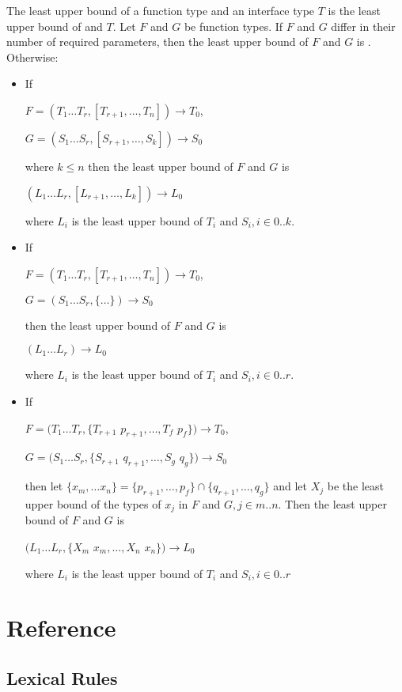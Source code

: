 \documentclass{article}
\begin{document}
\LMHash{}
The least upper bound of a function type and an interface type $T$ is the least upper bound of  and $T$.
Let $F$ and $G$ be function types. If $F$ and $G$ differ in their number of required parameters, then the least upper bound of $F$ and $G$ is .  Otherwise:
\begin{itemize}
\item If

$F= (T_1 \ldots T_r, [T_{r+1}, \ldots, T_n]) \longrightarrow T_0$,

$G= (S_1 \ldots S_r, [S_{r+1}, \ldots, S_k]) \longrightarrow S_0$

where $k \le n$ then the least upper bound of $F$ and $G$ is

$(L_1 \ldots L_r, [L_{r+1}, \ldots, L_k]) \longrightarrow L_0$

where $L_i$ is the least upper bound of $T_i$ and $S_i, i \in 0..k$.
\item If

$F= (T_1 \ldots T_r, [T_{r+1}, \ldots, T_n]) \longrightarrow T_0$,

$G= (S_1 \ldots S_r, \{ \ldots \}) \longrightarrow S_0$

then the least upper bound of $F$ and $G$ is

$(L_1 \ldots L_r) \longrightarrow L_0$

where $L_i$
is the least upper bound of $T_i$ and $S_i, i \in 0..r$.
\item If

$F= (T_1 \ldots T_r, \{T_{r+1}$  $p_{r+1}, \ldots, T_f$ $p_f\}) \longrightarrow T_0$,

$G= (S_1 \ldots S_r, \{ S_{r+1}$  $q_{r+1}, \ldots, S_g$ $q_g\}) \longrightarrow S_0$

then let $\{x_m, \ldots x_n\}  = \{p_{r+1}, \ldots, p_f\} \cap \{q_{r+1}, \ldots, q_g\}$ and let $X_j$ be the least upper bound of the types of $x_j$ in $F$ and $G, j \in m..n$. Then
the least upper bound of $F$ and $G$ is

$(L_1 \ldots L_r, \{ X_m$ $x_m, \ldots, X_n$ $x_n\}) \longrightarrow L_0$

where $L_i$ is the least upper bound of $T_i$ and $S_i, i \in 0..r$
\end{itemize}


\section{Reference}

\subsection{Lexical Rules}
\end{document}

